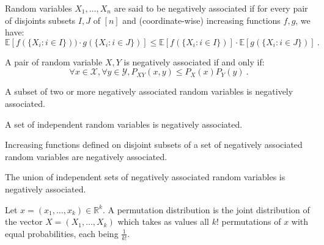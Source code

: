 \begin{definition}
   \label{defi:NA}
Random variables $X_1,\ldots,X_n$ are said to be negatively associated if for every pair of disjoints subsets $I,J$ of $[n]$ and (coordinate-wise) increasing functions $f,g$, we have:
    \[ \mathbb{E}[f(\{X_i : i \in I\})) \cdot g(\{X_i : i \in J\})] \leq  \mathbb{E}[f(\{X_i : i \in I\})] \cdot \mathbb{E}[g(\{X_i : i \in J\})] \ .\]
\end{definition}

\begin{proposition}
  \label{prop:NA_P1}
  A pair of random variable $X,Y$ is negatively associated if and only if:
  \[ \forall x \in \mathcal{X},  \forall y \in \mathcal{Y}, P_{XY}(x,y) \leq P_X(x)P_Y(y) \ .\]
\end{proposition}

\begin{proposition}
  \label{prop:NA_P4}
  A subset of two or more negatively associated random variables is negatively associated.
\end{proposition}

\begin{proposition}
  \label{prop:NA_P5}
  A set of independent random variables is negatively associated.
\end{proposition}

\begin{proposition}
  \label{prop:NA_P6}
  Increasing functions defined on disjoint subsets of a set of negatively associated random variables are negatively associated.
\end{proposition}

\begin{proposition}
    \label{prop:NA_P7}
    The union of independent sets of negatively associated random variables is negatively associated.
\end{proposition}

\begin{definition}
  \label{defi:perm}
  Let $x = (x_1,\ldots,x_k) \in \mathbb{R}^k$. A permutation distribution is the joint distribution of the vector $X = (X_1,\ldots,X_k)$ which takes as values all $k!$ permutations of $x$ with equal probabilities, each being $\frac{1}{k!}$.
\end{definition}

